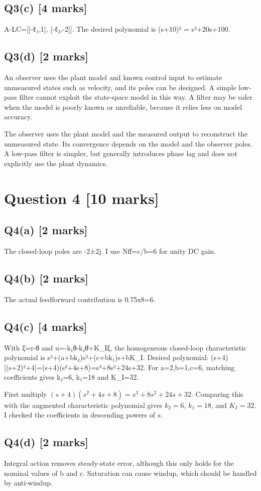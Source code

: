 \documentclass[11pt,a4paper]{article}
\begin{document}
\subsection*{Q3(c) \hfill [4 marks]}

A-LC=[[-ℓ₁,1], [-ℓ₂,-2]].
The desired polynomial is (s+10)² = s²+20s+100.

\subsection*{Q3(d) \hfill [2 marks]}

An observer uses the plant model and known control input to estimate unmeasured states such as velocity, and its poles can be designed.
A simple low-pass filter cannot exploit the state-space model in this way.
A filter may be safer when the model is poorly known or unreliable, because it relies less on model accuracy.\par\smallskip The observer uses the plant model and the measured output to reconstruct the unmeasured state. Its convergence depends on the model and the observer poles. A low-pass filter is simpler, but generally introduces phase lag and does not explicitly use the plant dynamics.

\section*{Question 4 \hfill [10 marks]}
\subsection*{Q4(a) \hfill [2 marks]}

The closed-loop poles are -2±2j.
I use Nff=c/b=6 for unity DC gain.

\subsection*{Q4(b) \hfill [2 marks]}

The actual feedforward contribution is 0.75x8=6.

\subsection*{Q4(c) \hfill [4 marks]}

With ξ̇=r-θ and u=-k₁θ-k₂θ̇+K\_Iξ, the homogeneous closed-loop characteristic polynomial is s³+(a+bk₂)s²+(c+bk₁)s+bK\_I.
Desired polynomial: (s+4)[(s+2)²+4]=(s+4)(s²+4s+8)=s³+8s²+24s+32.
For a=2,b=1,c=6, matching coefficients gives k₂=6, k₁=18 and K\_I=32.\par\smallskip First multiply $(s+4)(s^2+4s+8)=s^3+8s^2+24s+32$. Comparing this with the augmented characteristic polynomial gives $k_2=6$, $k_1=18$, and $K_I=32$. I checked the coefficients in descending powers of $s$.

\subsection*{Q4(d) \hfill [2 marks]}

Integral action removes steady-state error, although this only holds for the nominal values of b and c.
Saturation can cause windup, which should be handled by anti-windup.
\end{document}
